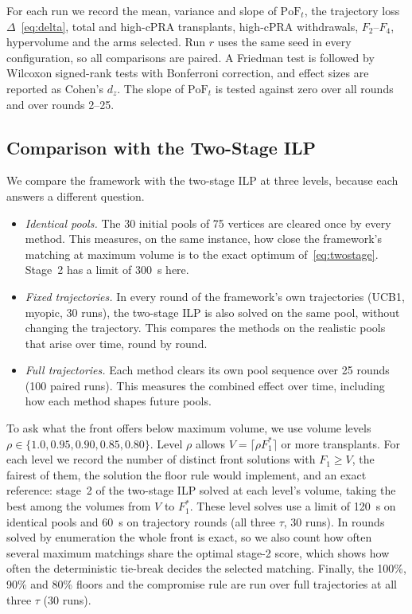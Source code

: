 \documentclass[journal]{IEEEtran}
\newcommand{\pof}{\ensuremath{\mathrm{PoF}_t}}
\begin{document}
For each run we record the mean, variance and slope of $\pof$, the
trajectory loss $\Delta$~\eqref{eq:delta}, total and high-cPRA
transplants, high-cPRA withdrawals, $F_2$--$F_4$, hypervolume and the
arms selected. Run $r$ uses the same seed in every configuration, so
all comparisons are paired. A Friedman test is followed by Wilcoxon
signed-rank tests with Bonferroni correction, and effect sizes are
reported as Cohen's $d_z$. The slope of $\pof$ is tested against zero
over all rounds and over rounds 2--25.

\subsection{Comparison with the Two-Stage ILP}
\label{sec:exp:levels}

We compare the framework with the two-stage ILP at three levels,
because each answers a different question.
\begin{itemize}
  \item \emph{Identical pools.} The 30 initial pools of 75 vertices
    are cleared once by every method. This measures, on the same
    instance, how close the framework's matching at maximum volume is
    to the exact optimum of~\eqref{eq:twostage}. Stage~2 has a limit
    of 300~s here.
  \item \emph{Fixed trajectories.} In every round of the framework's
    own trajectories (UCB1, myopic, 30 runs), the two-stage ILP is
    also solved on the same pool, without changing the trajectory.
    This compares the methods on the realistic pools that arise over
    time, round by round.
  \item \emph{Full trajectories.} Each method clears its own pool
    sequence over 25 rounds (100 paired runs). This measures the
    combined effect over time, including how each method shapes
    future pools.
\end{itemize}
To ask what the front offers below maximum volume, we use volume
levels $\rho \in \{1.0, 0.95, 0.90, 0.85, 0.80\}$. Level $\rho$ allows
$V = \lceil \rho F_1^{*} \rceil$ or more transplants. For each level we
record the number of distinct front solutions with $F_1 \geq V$, the
fairest of them, the solution the floor rule would implement, and an
exact reference: stage~2 of the two-stage ILP solved at each level's
volume, taking the best among the volumes from $V$ to $F_1^{*}$. These
level solves use a limit of 120~s on identical pools and 60~s on
trajectory rounds (all three $\tau$, 30 runs). In rounds solved by
enumeration the whole front is exact, so we also count how often
several maximum matchings share the optimal stage-2 score, which
shows how often the deterministic tie-break decides the selected
matching. Finally, the 100\%, 90\% and 80\% floors and the compromise
rule are run over full trajectories at all three $\tau$ (30 runs).
\end{document}
